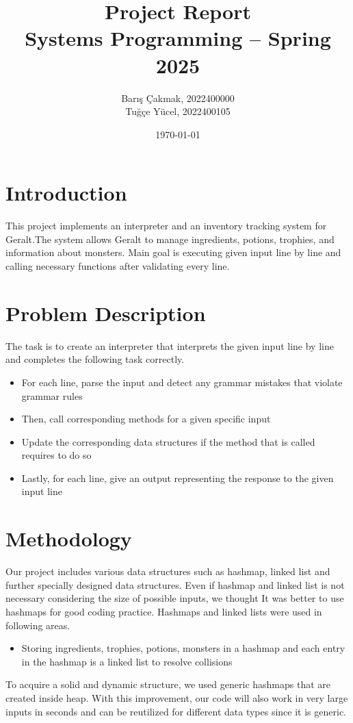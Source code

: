 \documentclass[a4paper,12pt]{article}
\title{Project Report  \\ \large Systems Programming – Spring 2025}
\author{Barış Çakmak, 2022400000 \\ Tuğçe Yücel, 2022400105
}
\date{\today}
\begin{document}
\maketitle


\section{Introduction}
This project implements an interpreter and an inventory tracking system for Geralt.The system allows Geralt to manage ingredients, potions, trophies, and information about monsters. Main goal is executing given input line by line and calling necessary functions after validating every line.

\section{Problem Description}
The task is to create an interpreter that interprets the given input line by line and completes the following task correctly.
\begin{itemize}
    \item For each line, parse the input and detect any grammar mistakes that violate grammar rules
    \item Then, call corresponding methods for a given specific input
    \item Update the corresponding data structures if the method that is called requires to do so
    \item Lastly, for each line, give an output representing the response to the given input line
\end{itemize}

\section{Methodology}
Our project includes various data structures such as hashmap, linked list and further specially designed data structures. Even if hashmap and linked list is not necessary considering the size of possible inputs, we thought It was better to use hashmaps for good coding practice. Hashmaps and linked lists were used in following areas.
\begin{itemize}
    \item Storing ingredients, trophies, potions, monsters in a hashmap and each entry in the hashmap is a linked list to resolve collisions
\end{itemize}
To acquire a solid and dynamic structure, we used generic hashmaps that are created inside heap. With this improvement, our code will also work in very large inputs in seconds and can be reutilized for different data types since it is generic.
\end{document}
